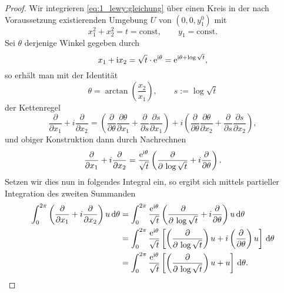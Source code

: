 \begin{proof}
Wir integrieren \eqref{eq:1_lewy:gleichung} über einen Kreis in der nach Voraussetzung existierenden Umgebung $U$ von $(0,0,y_1^0)$ mit 
\begin{equation}
x_1^2+x_2^2=t=\mathrm{const},\qquad y_1=\mathrm{const}.
\end{equation}
Sei $\theta$ derjenige Winkel gegeben durch
\begin{equation}
x_1+\mathrm i x_2=\sqrt{t}\cdot \mathrm e^{\mathrm i\theta} =\mathrm e^{\mathrm i\theta +\log\sqrt{t}},
\end{equation}
so erhält man mit der Identität
\begin{equation}
\theta=\arctan\left(\frac{x_2}{x_1}\right),\qquad s:=\log\sqrt{t}
\end{equation}
der Kettenregel 
\begin{equation}
\frac{\partial}{\partial x_1}+i\frac{\partial}{\partial x_2}
= \left(\frac{\partial}{\partial \theta} \frac{\partial\theta}{\partial x_1}+\frac{\partial}{\partial s}\frac{\partial s}{\partial x_1}\right)
+i \left(\frac{\partial}{\partial \theta} \frac{\partial\theta}{\partial x_2}+\frac{\partial}{\partial s}\frac{\partial s}{\partial x_2}\right),
\end{equation}
und obiger Konstruktion dann durch Nachrechnen
\begin{equation}\label{thm:1_lewy:proof1}
\frac{\partial}{\partial x_1} +i\frac{\partial}{\partial x_2}=\frac{\mathrm e^{\mathrm i\theta}}{\sqrt{t}} \left(\frac{\partial}{\partial \,\log \sqrt{t}}+i\frac{\partial}{\partial \theta}\right).
\end{equation}
Setzen wir dies nun in folgendes Integral ein, so ergibt sich mittels partieller Integration des zweiten Summanden
\begin{align}\label{thm:1_lewy:abl_gleich}
\begin{split}
\int_0^{2\pi} \left(\frac{\partial}{\partial x_1} +i\frac{\partial}{\partial x_2}\right)u\,\mathrm d\theta 
&= \int_0^{2\pi} \frac{\mathrm e^{\mathrm i\theta}}{\sqrt{t}} \left(\frac{\partial}{\partial \,\log \sqrt{t}}+i\frac{\partial}{\partial \theta}\right)u \,\mathrm d\theta \\
&= \int_0^{2\pi} \frac{\mathrm e^{\mathrm i\theta}}{\sqrt{t}} \left[ \left(\frac{\partial}{\partial \,\log \sqrt{t}}\right)u +i\left(\frac{\partial}{\partial \theta}\right)u\right]\,\mathrm d\theta \\
&= \int_0^{2\pi} \frac{\mathrm e^{\mathrm i\theta}}{\sqrt{t}} \left[ \left(\frac{\partial}{\partial \,\log \sqrt{t}}\right)u +u\right]\,\mathrm d\theta .
\end{split}
\end{align}

\end{proof}
